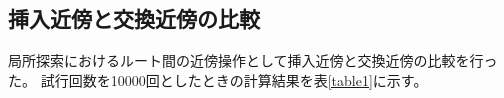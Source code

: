\subsection{挿入近傍と交換近傍の比較}
局所探索におけるルート間の近傍操作として挿入近傍と交換近傍の比較を行った。
試行回数を10000回としたときの計算結果を表\ref{table1}に示す。




